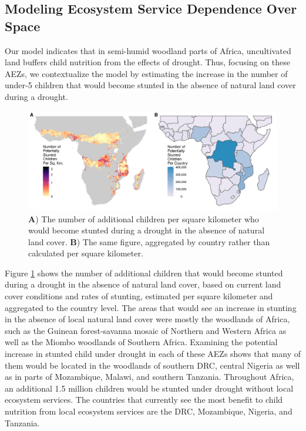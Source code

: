 \documentclass{article}
\begin{document}
\subsection{Modeling Ecosystem Service Dependence Over Space}
Our model indicates that in semi-humid woodland parts of Africa, uncultivated land buffers child nutrition from the effects of drought.  Thus, focusing on these AEZs, we contextualize the model by estimating the increase in the number of under-5 children that would become stunted in the absence of natural land cover during a drought.

\begin{figure}[h!]
	\begin{center}
		\includegraphics[width=\linewidth]{AfricaEffect.png}
    \caption{\textbf{A}) The number of additional children per square kilometer who would become stunted during a drought in the absence of natural land cover.  \textbf{B}) The same figure, aggregated by country rather than calculated per square kilometer.}
		\label{fig:AfricaEffect}
	\end{center}
\end{figure}

Figure \ref{fig:AfricaEffect} shows the number of additional children that would become stunted during a drought in the absence of natural land cover, based on current land cover conditions and rates of stunting, estimated per square kilometer and aggregated to the country level.  The areas that would see an increase in stunting in the absence of local natural land cover were mostly the woodlands of Africa, such as the Guinean forest-savanna mosaic of Northern and Western Africa as well as the Miombo woodlands of Southern Africa. Examining the potential increase in stunted child under drought in each of these AEZs shows that many of them would be located in the woodlands of southern DRC, central Nigeria as well as in parts of Mozambique, Malawi, and southern Tanzania.  Throughout Africa, an additional 1.5 million children would be stunted under drought without local ecosystem services.  The countries that currently see the most benefit to child nutrition from local ecosystem services are the DRC, Mozambique, Nigeria, and Tanzania.
\end{document}
